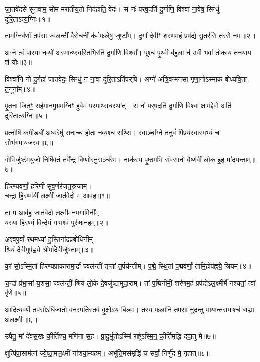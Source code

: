 जा॒तवे॑दसे सुनवाम॒ सोम॑ मरातीय॒तो निद॑हाति॒ वेदः॑।
स नः॑ पर्‌ष॒दति॑ दु॒र्गाणि॒ विश्वा॑ ना॒वेव॒ सिन्धुं॑ दुरि॒ताऽत्य॒ग्निः॥१॥

ताम॒ग्निव॑र्णां॒ तप॑सा ज्वल॒न्तीं वै॑रोच॒नीं क॑र्मफ॒लेषु॒ जुष्टा᳚म्।
दु॒र्गां दे॒वीꣳ शर॑णम॒हं प्रप॑द्ये सु॒तर॑सि तरसे॒ नमः॑॥२॥

अग्ने॒ त्वं पा॑रया॒ नव्यो॑ अ॒स्मान्थ्स्व॒स्तिभि॒रति॑ दु॒र्गाणि॒ विश्वा᳚।
पूश्च॑ पृ॒थ्वी ब॑हु॒ला न॑ उ॒र्वी भवा॑ तो॒काय॒ तन॑याय॒ शं योः॥३॥

विश्वा॑नि नो दु॒र्गहा॑ जातवेदः॒ सिन्धुं॒ न ना॒वा दु॑रि॒ताऽति॑पर्‌\mbox{}षि।
अग्ने॑ अत्रि॒वन्मन॑सा गृणा॒नो᳚ऽस्माकं॑ बोध्यवि॒ता त॒नूना᳚म्॥४॥

पृ॒त॒ना॒ जित॒ꣳ॒ सह॑मानमु॒ग्रम॒ग्निꣳ हु॑वेम पर॒माथ्स॒धस्था᳚त्।
स नः॑ पर्‌ष॒दति॑ दु॒र्गाणि॒ विश्वा॒ क्षाम॑द्दे॒वो अति॑ दुरि॒तात्य॒ग्निः॥५॥

प्र॒त्नोषि॑ क॒मीड्यो॑ अध्व॒रेषु॑ स॒नाच्च॒ होता॒ नव्य॑श्च॒ सथ्सि॑।
स्वाञ्चा᳚ग्ने त॒नुवं॑ पि॒प्रय॑स्वा॒स्मभ्यं॑ च॒ सौभ॑ग॒माय॑जस्व॥६॥

गोभि॒र्जुष्ट॑म॒युजो॒ निषि॑क्तं॒ तवे᳚न्द्र विष्णो॒रनु॒सञ्च॑रेम।
नाक॑स्य पृ॒ष्ठम॒भि सं॒वसा॑नो॒ वैष्ण॑वीं लो॒क इ॒ह मा॑दयन्ताम्॥७॥



{\centering
हिर॑ण्यवर्णां॒ हरि॑णीं सुव॒र्णर॑जत॒स्रजाम्।\\
च॒न्द्रां॒ हि॒रण्म॑यीं ल॒क्ष्मीं॒ जात॑वेदो म॒ आव॑ह॥१॥

तां म॒ आव॑ह॒ जात॑वेदो ल॒क्ष्मीमन॑पगा॒मिनी᳚म्।\\
यस्यां॒ हिर॑ण्यं वि॒न्देयं॒ गामश्वं॒ पुरु॑षान॒हम्॥२॥

अ॒श्व॒पू॒र्वां र॑थम॒ध्यां॒ ह॒स्तिना॑दप्र॒बोधि॑नीम्।\\
श्रियं॑ दे॒वीमुप॑ह्वये॒ श्रीर्मा॑दे॒वीर्जु॑षताम्॥३॥

}

कां॒ सो॒ऽ॒स्मि॒तां हिर॑ण्यप्राकारामा॒र्द्रां ज्वल॑न्तीं तृ॒प्तां त॒र्पय॑न्तीम्।
प॒द्मे॒ स्थि॒तां प॒द्मव॑र्णां॒ तामि॒होप॑ह्वये॒ श्रियम्॥४॥

च॒न्द्रां प्र॑भा॒सां य॒शसा॒ ज्वल॑न्तीं॒ श्रियं॑ लो॒के दे॒वजु॑ष्टामुदा॒राम्।
तां प॒द्मिनी॑मीं॒ शर॑णम॒हं प्रप॑द्येऽल॒क्ष्मीर्मे॑ नश्यतां॒ त्वां वृ॑णे॥५॥

आ॒दि॒त्यव॑र्णे॒ तप॒सोऽधि॑जा॒तो वन॒स्पति॒स्तव॑ वृ॒क्षोऽथ बि॒ल्वः।
तस्य॒ फला॑नि॒ तप॒सा नु॑दन्तु मा॒यान्त॑रा॒याश्च॑ बा॒ह्या अ॑ल॒क्ष्मीः॥६॥

उपै॑तु॒ मां दे॑वस॒खः की॒र्तिश्च॒ मणि॑ना स॒ह।
प्रा॒दु॒र्भू॒तोऽस्मि॑ राष्ट्रे॒ऽ॒स्मि॒न्॒ की॒र्तिमृद्धिं॑ ददा॒तु मे॥७॥

क्षुत्पि॑पा॒साम॑लां ज्ये॒ष्ठा॒मल॒क्ष्मीं ना॑शया॒म्यहम्।
अभू॑ति॒\-मस॑मृद्धिं॒ च सर्वां॒ निर्णु॑द मे॒ गृहात्॥८॥

